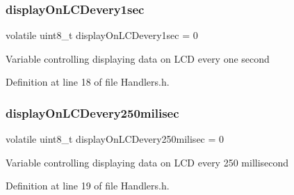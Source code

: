 \subsubsection{\texorpdfstring{displayOnLCDevery1sec}{displayOnLCDevery1sec}}
{\footnotesize\ttfamily volatile uint8\+\_\+t display\+On\+L\+C\+Devery1sec = 0}

Variable controlling displaying data on L\+CD every one second 

Definition at line 18 of file Handlers.\+h.

\mbox{\label{group___handlers_ga859225fb2b0f2a730346fa92e3b7fe9b_ga859225fb2b0f2a730346fa92e3b7fe9b}} 
\subsubsection{\texorpdfstring{displayOnLCDevery250milisec}{displayOnLCDevery250milisec}}
{\footnotesize\ttfamily volatile uint8\+\_\+t display\+On\+L\+C\+Devery250milisec = 0}

Variable controlling displaying data on L\+CD every 250 millisecond 

Definition at line 19 of file Handlers.\+h.

